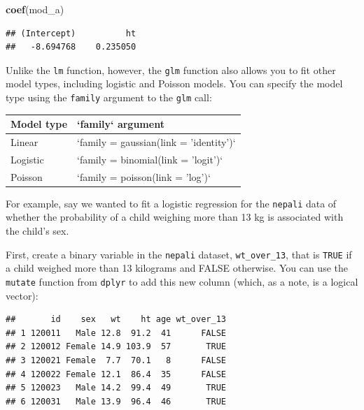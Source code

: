 \documentclass[]{book}
\makeatletter
\newenvironment{Shaded}{\begin{snugshade}}{\end{snugshade}}
\newcommand{\KeywordTok}[1]{\textcolor[rgb]{0.13,0.29,0.53}{\textbf{#1}}}
\newcommand{\DataTypeTok}[1]{\textcolor[rgb]{0.13,0.29,0.53}{#1}}
\newcommand{\DecValTok}[1]{\textcolor[rgb]{0.00,0.00,0.81}{#1}}
\newcommand{\StringTok}[1]{\textcolor[rgb]{0.31,0.60,0.02}{#1}}
\newcommand{\OperatorTok}[1]{\textcolor[rgb]{0.81,0.36,0.00}{\textbf{#1}}}
\newcommand{\NormalTok}[1]{#1}
\newenvironment{kframe}{%
\medskip{}
\setlength{\fboxsep}{.8em}
 \def\at@end@of@kframe{}%
 \ifinner\ifhmode%
  \def\at@end@of@kframe{\end{minipage}}%
  \begin{minipage}{\columnwidth}%
 \fi\fi%
 \def\FrameCommand##1{\hskip\@totalleftmargin \hskip-\fboxsep
 \colorbox{shadecolor}{##1}\hskip-\fboxsep
     \hskip-\linewidth \hskip-\@totalleftmargin \hskip\columnwidth}%
 \MakeFramed {\advance\hsize-\width
   \@totalleftmargin\z@ \linewidth\hsize
   \@setminipage}}%
 {\par\unskip\endMakeFramed%
 \at@end@of@kframe}
\renewenvironment{Shaded}{\begin{kframe}}{\end{kframe}}
\theoremstyle{definition}
\theoremstyle{definition}
\theoremstyle{definition}
\theoremstyle{remark}
\makeatother
\begin{document}
\begin{Shaded}
\begin{Highlighting}[]
\KeywordTok{coef}\NormalTok{(mod_a)}
\end{Highlighting}
\end{Shaded}

\begin{verbatim}
## (Intercept)          ht 
##   -8.694768    0.235050
\end{verbatim}

Unlike the \texttt{lm} function, however, the \texttt{glm} function also
allows you to fit other model types, including logistic and Poisson
models. You can specify the model type using the \texttt{family}
argument to the \texttt{glm} call:

\begin{tabular}{l|l}
\hline
Model type & `family` argument\\
\hline
Linear & `family = gaussian(link = 'identity')`\\
\hline
Logistic & `family = binomial(link = 'logit')`\\
\hline
Poisson & `family = poisson(link = 'log')`\\
\hline
\end{tabular}

For example, say we wanted to fit a logistic regression for the
\texttt{nepali} data of whether the probability of a child weighing more
than 13 kg is associated with the child's sex.

First, create a binary variable in the \texttt{nepali} dataset,
\texttt{wt\_over\_13}, that is \texttt{TRUE} if a child weighed more
than 13 kilograms and FALSE otherwise. You can use the \texttt{mutate}
function from \texttt{dplyr} to add this new column (which, as a note,
is a logical vector):

\begin{Shaded}
\end{Shaded}

\begin{verbatim}
##       id    sex   wt    ht age wt_over_13
## 1 120011   Male 12.8  91.2  41      FALSE
## 2 120012 Female 14.9 103.9  57       TRUE
## 3 120021 Female  7.7  70.1   8      FALSE
## 4 120022 Female 12.1  86.4  35      FALSE
## 5 120023   Male 14.2  99.4  49       TRUE
## 6 120031   Male 13.9  96.4  46       TRUE
\end{verbatim}
\end{document}
